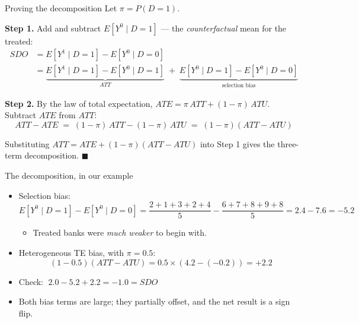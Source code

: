 \documentclass[
  11pt,
  ignorenonframetext,
  aspectratio=169,
]{beamer}
\providecommand{\tightlist}{%
  \setlength{\itemsep}{0pt}\setlength{\parskip}{0pt}}
\begin{document}
\begin{frame}{Proving the decomposition}
\protect{}\label{proving-the-decomposition}
Let \(\pi = P(D{=}1)\).

\textbf{Step 1.} Add and subtract \(E[Y^0 \mid D{=}1]\) --- the
\emph{counterfactual} mean for the treated: \[
\begin{aligned}
SDO &= E[Y^1 \mid D{=}1] - E[Y^0 \mid D{=}0] \\
    &= \underbrace{E[Y^1 \mid D{=}1] - E[Y^0 \mid D{=}1]}_{ATT} \;+\;
       \underbrace{E[Y^0 \mid D{=}1] - E[Y^0 \mid D{=}0]}_{\text{selection bias}}
\end{aligned}
\]

\textbf{Step 2.} By the law of total expectation,
\(ATE = \pi\,ATT + (1-\pi)\,ATU\). Subtract \(ATE\) from \(ATT\): \[
ATT - ATE \;=\; (1-\pi)\,ATT - (1-\pi)\,ATU \;=\; (1-\pi)(ATT - ATU)
\]

Substituting \(ATT = ATE + (1-\pi)(ATT-ATU)\) into Step 1 gives the
three-term decomposition. \(\blacksquare\)
\end{frame}

\begin{frame}{The decomposition, in our example}
\protect{}\label{the-decomposition-in-our-example}
\begin{itemize}
\tightlist
\item
  Selection bias: \small \[
  E[Y^0 \mid D{=}1] - E[Y^0 \mid D{=}0] = \frac{2+1+3+2+4}{5} - \frac{6+7+8+9+8}{5} = 2.4 - 7.6 = -5.2
  \] \normalsize

  \begin{itemize}
  \tightlist
  \item
    Treated banks were \emph{much weaker} to begin with.
  \end{itemize}
\item
  Heterogeneous TE bias, with \(\pi = 0.5\): \[
  (1 - 0.5)(ATT - ATU) = 0.5 \times (4.2 - (-0.2)) = +2.2
  \]
\item
  Check: \(\;2.0 - 5.2 + 2.2 = -1.0 = SDO\) \checkmark
\item
  Both bias terms are large; they partially offset, and the net result
  is a sign flip.
\end{itemize}
\end{frame}
\end{document}
